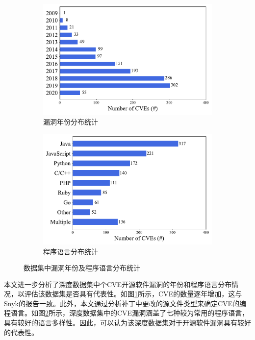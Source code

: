 \begin{figure}[!t]
    \centering
    \begin{subfigure}[b]{0.45\textwidth}
    \centering
    \includegraphics[scale=0.46]{res/rq0-year.pdf}
    \caption{漏洞年份分布统计}\label{fig:rq0-year}
    \end{subfigure}
    \begin{subfigure}[b]{0.45\textwidth}
    \centering
    \includegraphics[scale=0.46]{res/rq0-language.pdf}
    \caption{程序语言分布统计}\label{fig:rq0-language}
    \end{subfigure}
    \caption{数据集中漏洞年份及程序语言分布统计}\label{fig:dataset}
\end{figure}


本文进一步分析了深度数据集中个CVE开源软件漏洞的年份和程序语言分布情况，以评估该数据集是否具有代表性。如图\ref{fig:rq0-year}所示，CVE的数量逐年增加，这与Snyk的报告\cite{Snyk-report}一致。此外，本文通过分析补丁中更改的源文件类型来确定CVE的编程语言。如图\ref{fig:rq0-language}所示，深度数据集中的CVE漏洞涵盖了七种较为常用的程序语言，具有较好的语言多样性。因此，可以认为该深度数据集对于开源软件漏洞具有较好的代表性。


